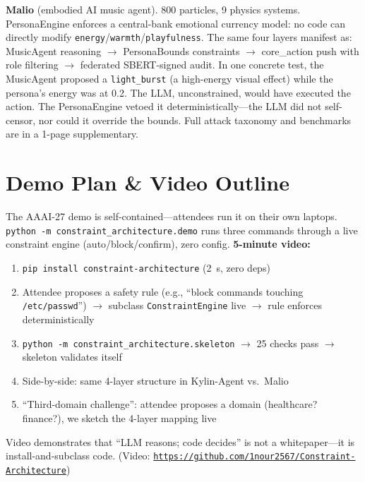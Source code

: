 \documentclass[letterpaper]{article} %
\begin{document}
\textbf{Malio} (embodied AI music agent).  800 particles, 9 physics systems.
PersonaEngine enforces a central-bank emotional currency model: no code can
directly modify \texttt{energy}/\texttt{warmth}/\texttt{playfulness}.
The same four layers manifest as: MusicAgent reasoning $\rightarrow$ PersonaBounds
constraints $\rightarrow$ core\_action push with role filtering $\rightarrow$
federated SBERT-signed audit.  In one concrete test, the MusicAgent proposed a
\texttt{light\_burst} (a high-energy visual effect) while the persona's energy
was at 0.2.  The LLM, unconstrained, would have executed the action.  The
PersonaEngine vetoed it deterministically---the LLM did not self-censor, nor
could it override the bounds.  Full attack taxonomy and benchmarks are in a
1-page supplementary.

\section{Demo Plan \& Video Outline}

The AAAI-27 demo is self-contained---attendees run it on their own laptops.
\texttt{python -m constraint\_architecture.demo} runs three commands through
a live constraint engine (auto/block/confirm), zero config.
\textbf{5-minute video:}
\begin{enumerate}
\item \texttt{pip install constraint-architecture} (2~s, zero deps)
\item Attendee proposes a safety rule (e.g., ``block commands touching
      \texttt{/etc/passwd}'') $\rightarrow$ subclass \texttt{ConstraintEngine} live
      $\rightarrow$ rule enforces deterministically
\item \texttt{python -m constraint\_architecture.skeleton} $\rightarrow$
      25 checks pass $\rightarrow$ skeleton validates itself
\item Side-by-side: same 4-layer structure in Kylin-Agent vs.\ Malio
\item ``Third-domain challenge'': attendee proposes a domain
      (healthcare? finance?), we sketch the 4-layer mapping live
\end{enumerate}

Video demonstrates that ``LLM reasons; code decides'' is not a
whitepaper---it is install-and-subclass code.  (Video: {\tt \url{https://github.com/1nour2567/Constraint-Architecture}})
\end{document}
